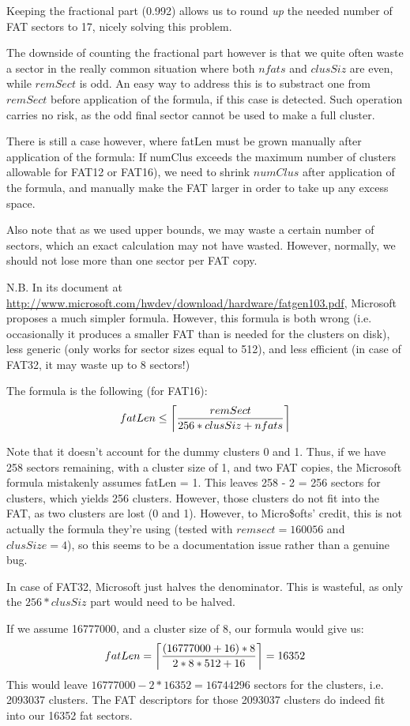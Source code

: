 \documentclass[a4paper,12pt]{article}
\begin{document}
Keeping the fractional part (0.992) allows us to round {\em up} the
needed number of FAT sectors to 17, nicely solving this problem.

The downside of counting the fractional part however is that we quite
often waste a sector in the really common situation where both $nfats$
and $clusSiz$ are even, while $remSect$ is odd. An easy way to address
this is to substract one from $remSect$ before application of the
formula, if this case is detected. Such operation carries no risk, as
the odd final sector cannot be used to make a full cluster.

There is still a case however, where fatLen must be grown manually
after application of the formula: If numClus exceeds the maximum
number of clusters allowable for FAT12 or FAT16), we need to shrink
$numClus$ after application of the formula, and manually make the FAT
larger in order to take up any excess space.

Also note that as we used upper bounds, we may waste a certain number
of sectors, which an exact calculation may not have wasted. However,
normally, we should not lose more than one sector per FAT copy.

N.B. In its document at \url{http://www.microsoft.com/hwdev/download/hardware/fatgen103.pdf},
Microsoft proposes a much simpler formula. However, this formula is
both wrong (i.e. occasionally it produces a smaller FAT than is
needed for the clusters on disk), less generic (only works for sector
sizes equal to 512), and less efficient (in case of FAT32, it may
waste up to 8 sectors!)

The formula is the following (for FAT16):
$$
fatLen \le \left\lceil { remSect \over 256 * clusSiz + nfats} \right\rceil
$$

Note that it doesn't account for the dummy clusters 0 and 1. Thus, if
we have 258 sectors remaining, with a cluster size of 1, and two FAT
copies, the Microsoft formula mistakenly assumes fatLen = 1. This
leaves 258 - 2 = 256 sectors for clusters, which yields 256 clusters.
However, those clusters do not fit into the FAT, as two clusters are
lost (0 and 1). However, to Micro\$ofts' credit, this is not actually
the formula they're using (tested with $remsect=160056$ and
$clusSize=4$), so this seems to be a documentation issue rather than a
genuine bug.

In case of FAT32, Microsoft just halves the denominator. This is
wasteful, as only the $256*clusSiz$ part would need to be halved.

If we assume 16777000, and a cluster size of 8, our formula would give
us:
$$fatLen = \left\lceil (16777000 + 16) * 8 \over 2 * 8 * 512 + 16
\right\rceil = 16352$$
This would leave $16777000-2*16352=16744296$ sectors for the clusters,
i.e. 2093037 clusters. The FAT descriptors for those 2093037 clusters
do indeed fit into our 16352 fat sectors.
\end{document}
